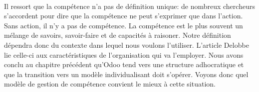 \paragraph{}Il ressort que la compétence n'a pas de définition unique: de nombreux chercheurs s'accordent pour dire que la compétence ne peut s'exprimer que dans l'action. Sans action, il n'y a pas de compétence. La compétence est le plus souvent un mélange de savoirs, savoir-faire et de capacités à raisoner. Notre définition dépendra donc du contexte dans lequel nous voulons l'utiliser. L'article Delobbe~\citep[pp.31]{delobbe} lie celle-ci aux caractéristiques de l'organisation qui va l'employer. Nous avons conclu au chapitre précédent qu'Odoo tend vers une structure adhocratique et que la transition vers un modèle individualisant doit s'opérer. Voyons donc quel modèle de gestion de compétence convient le mieux à cette situation.


